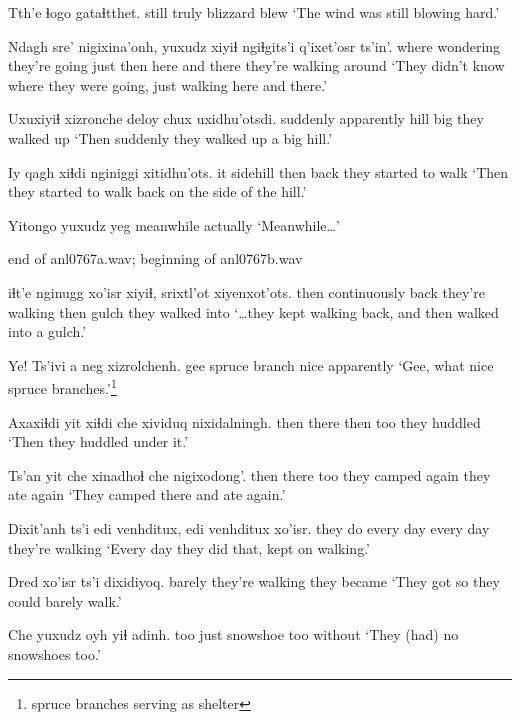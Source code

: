 \documentclass[12pt]{article}
\begin{document}
\gll Tth'e ɬogo  gataɬtthet.
still truly {blizzard blew}
\glt `The wind was still blowing hard.'
\glend

\gll Ndagh sre'      nigixina'onh, yuxudz xiyiɬ ngiɬgits'i q'ixet'osr ts'in'.
where wondering  {they're going}  just then         {here and there}       {they're walking around}
\glt `They didn't know where they were going, just walking here and there.'
\glend

\gll Uxuxiyiɬ xizronche deloy chux uxidhu'otsdi.
suddenly      apparently    hill  big  {they walked up}
\glt `Then suddenly they walked up a big hill.'
\glend

\gll Iy qagh  xiɬdi nginiggi xitidhu'ots.
it sidehill then  back     {they started to walk}
\glt `Then they started to walk back on the side of the hill.'
\glend

\gll Yitongo   {yuxudz yeg}
 meanwhile actually
\glt  `Meanwhile\ldots'
\glend

end of anl0767a.wav; beginning of anl0767b.wav

 iɬt'e        nginugg xo'isr          xiyiɬ, srixtl'ot xiyenxot'ots.
then           continuously back    {they're walking} then  gulch     {they walked into}
\glt `\ldots they kept walking back, and then walked into a gulch.'
\glend

\gll Ye! Ts'ivi        a neg xizrolchenh.
gee {spruce branch} {}  nice  apparently
\glt `Gee, what nice spruce branches.'\footnote{spruce branches serving as shelter}
\glend 

\gll Axaxiɬdi yit   xiɬdi che {xividuq nixidalningh. }
then     there then  too {they huddled}
\glt `Then they huddled under it.'
\glend

\gll Ts'an yit   che xinadhoɬ    che   nigixodong'.
then  there too {they camped} again {they ate again}
\glt `They camped there and ate again.'
\glend

\gll Dixit'anh ts'i {edi venhditux}, {edi venhditux} xo'isr.
{they do}  {}      {every day}      {every day}     {they're walking}
\glt `Every day they did that, kept on walking.'
\glend

\gll Dred   xo'isr          ts'i dixidiyoq.
barely {they're walking}  {}    {they became}
\glt `They got so they could barely walk.'
\glend

\gll Che yuxudz oyh      yiɬ adinh.
too just   snowshoe too without
\glt `They (had) no snowshoes too.'
\glend
\end{document}
